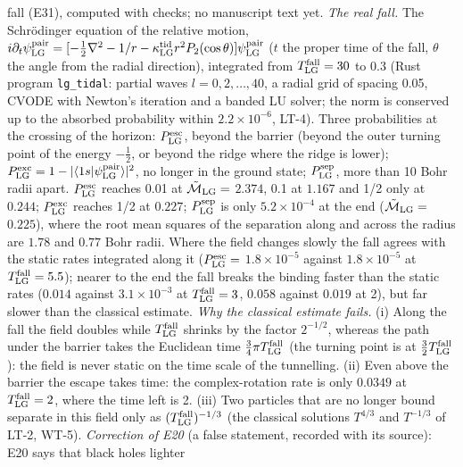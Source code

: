 \documentclass[
  10pt,
]{article}
\begin{document}
\begin{longtable}[]
fall (E31), computed with checks; no manuscript text yet. \emph{The real
fall.} The Schrödinger equation of the relative motion,
\(i\partial_t\psi^{\rm pair}_{\rm LG}=[-\tfrac12\nabla^2-1/r-\kappa^{\rm tid}_{\rm LG}r^2P_2(\cos\theta)]\psi^{\rm pair}_{\rm LG}\)
(\(t\) the proper time of the fall, \(\theta\) the angle from the radial
direction), integrated from \(T^{\rm fall}_{\rm LG}=30\) to \(0.3\)
(Rust program \texttt{lg\_tidal}: partial waves \(l=0,2,\dots,40\), a
radial grid of spacing 0.05, CVODE with Newton's iteration and a banded
LU solver; the norm is conserved up to the absorbed probability within
\(2.2\times10^{-6}\), LT-4). Three probabilities at the crossing of the
horizon: \(P^{\rm esc}_{\rm LG}\), beyond the barrier (beyond the outer
turning point of the energy \(-\tfrac12\), or beyond the ridge where the
ridge is lower);
\(P^{\rm exc}_{\rm LG}=1-\lvert\langle1s\vert\psi^{\rm pair}_{\rm LG}\rangle\rvert^2\),
no longer in the ground state; \(P^{\rm sep}_{\rm LG}\), more than 10
Bohr radii apart. \(P^{\rm esc}_{\rm LG}\) reaches 0.01 at
\(\tilde{\mathcal M}_{\rm LG}=\) \(2.374\), 0.1 at \(1.167\) and 1/2
only at \(0.244\); \(P^{\rm exc}_{\rm LG}\) reaches 1/2 at \(0.227\);
\(P^{\rm sep}_{\rm LG}\) is only \(5.2\times10^{-4}\) at the end
(\(\tilde{\mathcal M}_{\rm LG}=\) \(0.225\)), where the root mean
squares of the separation along and across the radius are \(1.78\) and
\(0.77\) Bohr radii. Where the field changes slowly the fall agrees with
the static rates integrated along it (\(P^{\rm esc}_{\rm LG}=\)
\(1.8\times10^{-5}\) against \(1.8\times10^{-5}\) at
\(T^{\rm fall}_{\rm LG}=5.5\)); nearer to the end the fall breaks the
binding faster than the static rates (\(0.014\) against
\(3.1\times10^{-3}\) at \(T^{\rm fall}_{\rm LG}=3\), \(0.058\) against
\(0.019\) at 2), but far slower than the classical estimate. \emph{Why
the classical estimate fails.} (i) Along the fall the field doubles
while \(T^{\rm fall}_{\rm LG}\) shrinks by the factor \(2^{-1/2}\),
whereas the path under the barrier takes the Euclidean time
\(\tfrac34\pi T^{\rm fall}_{\rm LG}\) (the turning point is at
\(\tfrac32T^{\rm fall}_{\rm LG}\)): the field is never static on the
time scale of the tunnelling. (ii) Even above the barrier the escape
takes time: the complex-rotation rate is only \(0.0349\) at
\(T^{\rm fall}_{\rm LG}=2\), where the time left is 2. (iii) Two
particles that are no longer bound separate in this field only as
\((T^{\rm fall}_{\rm LG})^{-1/3}\) (the classical solutions \(T^{4/3}\)
and \(T^{-1/3}\) of LT-2, WT-5). \emph{Correction of E20} (a false
statement, recorded with its source): E20 says that black holes lighter

\end{longtable}
\end{document}
